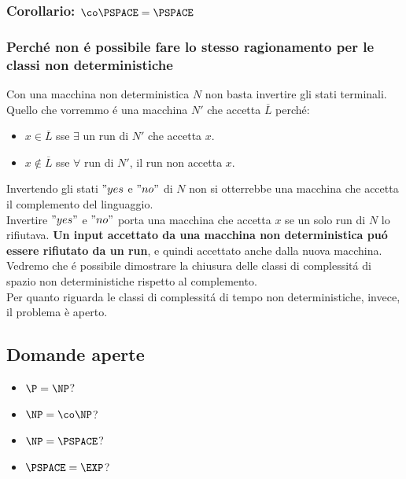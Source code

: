 \subsubsection{Corollario: $\co \PSPACE = \PSPACE$}
\subsubsection{Perché non é possibile fare lo stesso ragionamento per le classi non deterministiche}
Con una macchina non deterministica $N$ non basta invertire gli stati terminali. \\
Quello che vorremmo é una macchina $N'$ che accetta $\overline{L}$ perché:
\begin{itemize}
\item $x \in \overline{L}$ sse $\exists$ un run di $N'$ che accetta $x$.
\item $x \notin \overline{L}$ sse $\forall$ run di $N'$, il run non accetta $x$.
\end{itemize}
Invertendo gli stati $"yes$ e $"no"$ di $N$ non si otterrebbe una macchina che accetta il complemento del linguaggio. \\ 
Invertire $"yes"$ e $"no"$ porta una macchina che accetta $x$ se un solo run di $N$ lo rifiutava. 
\textbf{Un input accettato da una macchina non deterministica puó essere rifiutato da un run}, e quindi accettato anche dalla nuova macchina. \\

Vedremo che é possibile dimostrare la chiusura delle classi di complessitá di spazio non deterministiche rispetto al complemento. \\
Per quanto riguarda le classi di complessitá di tempo non deterministiche, invece, il problema è aperto.


\subsection{Domande aperte}
\begin{itemize}
    \item $\P = \NP$?
    \item $\NP = \co\NP$?
    \item $\NP = \PSPACE$?
    \item $\PSPACE = \EXP$?
\end{itemize}

